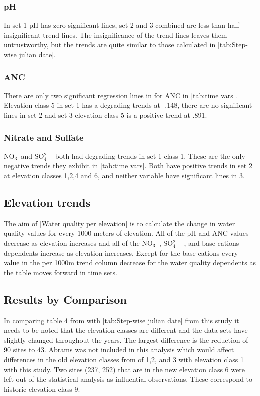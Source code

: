 \subsubsection{pH}

In set 1 pH has zero significant lines, set 2 and 3 combined are less than half insignificant trend lines. The insignificance of the trend lines leaves them untrustworthy, but the trends are quite similar to those calculated in \autoref{tab:Step-wise julian date}.

\subsubsection{ANC}

There are only two significant regression lines in for ANC in \autoref{tab:time vars}. Elevation class 5 in set 1 has a degrading trends at -.148, there are no significant lines in set 2 and set 3 elevation class 5 is a positive trend at .891.

\subsubsection{Nitrate and Sulfate}

NO$_3^-$ and SO$_4^{2-}$ both had degrading trends in set 1 class 1. These are the only negative trends they exhibit in \autoref{tab:time vars}.  Both have positive trends in set 2 at elevation classes 1,2,4 and 6, and neither variable have significant lines in 3.

\subsection{Elevation trends}

The aim of \autoref{Water quality per elevation} is to calculate the change in water quality values for every 1000 meters of elevation.  All of the pH and ANC values decrease as elevation increases and all of the  NO$_3^-$ , SO$_4^{2-}$ , and base cations dependents increase as elevation increases.  Except for the base cations every value in the per 1000m trend column decrease for the water quality dependents as the table moves forward in time sets.

\subsection{Results by Comparison}

In comparing table 4 from \citet{robinson2008ph} with \autoref{tab:Step-wise julian date} from this study it needs to be noted that the elevation classes are different and the data sets have slightly changed throughout the years. The largest difference is the reduction of 90 sites to 43. Abrams was not included in this analysis which would affect differences in the old elevation classes from \citet{robinson2008ph} of 1,2, and 3 with elevation class 1 with this study. Two sites (237, 252) that are in the new elevation class 6 were left out of the statistical analysis as influential observations. These correspond to historic elevation class 9.

